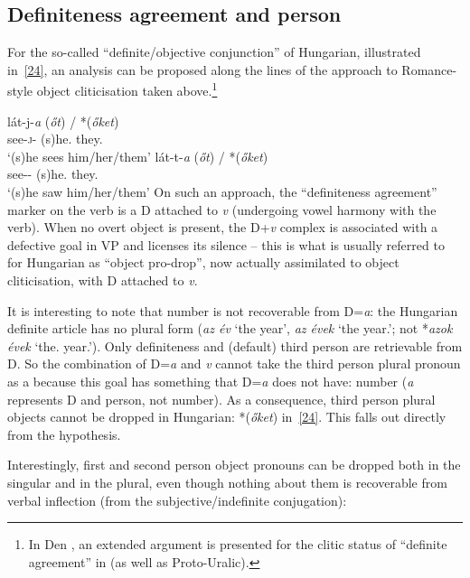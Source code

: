 \documentclass[output=paper]{langsci/langscibook}
\begin{document}
\begin{refcontext}
\section{Definiteness agreement and person}
\label{sec:16.5}

For the so-called \enquote{definite/objective conjunction} of Hungarian, illustrated
in~\eqref{24}, an analysis can be proposed along the lines of the approach to
Romance-style object cliticisation taken above.\footnote{In Den
    \citet{dikkenkeneseifs}, an extended argument is presented for the clitic
    status of \enquote{definite agreement} in  (as well as Proto-Uralic).}

\ea \label{24}
    \ea \gll l\'at-j-\emph{a} (\emph{\H{o}t}) / *(\emph{\H{o}ket})\\
    see-\textsc{j}-\Def{} (s)he.\Acc{} {} \phantom{*(}they.\Acc{}\\
    \glt \enquote*{(s)he sees him/her/them}
     \ex \gll   l\'at-t-\emph{a} (\emph{\H{o}t}) / *(\emph{\H{o}ket})\\
    see-\Pst-\Def{} (s)he.\Acc{} {} \phantom{*(}they.\Acc{}\\
    \glt \enquote*{(s)he saw him/her/them}
    \z
\z
On such an approach, the \enquote{definiteness agreement} marker on the verb is a D
attached to \emph{v} (undergoing vowel harmony with the verb). When no overt
object is present, the D+\emph{v} complex is associated with a defective goal
in VP and licenses its silence -- this is what is usually referred to for
Hungarian as \enquote{object pro-drop}, now actually assimilated to object
cliticisation, with D attached to \emph{v}.

It is interesting to note that number is not recoverable from D=\emph{a}: the
Hungarian definite article has no plural form (\emph{az \'ev} \enquote*{the year},
\emph{az \'evek} \enquote*{the year.\Pl{}}; not *\emph{azok \'evek}
\enquote*{the.\Pl{} year.\Pl{}}).  Only definiteness and (default) third
person are retrievable from D. So the combination of D=\emph{a} and \emph{v}
cannot take the third person plural pronoun as a  because this
goal has something that D=\emph{a} does not have: number (\emph{a} represents D
and person, not number). As a consequence, third person plural objects cannot
be dropped in Hungarian: *(\emph{\H{o}ket}) in~\eqref{24}. This falls out
directly from the  hypothesis.

Interestingly, first and second person object pronouns can be dropped both in
the singular and in the plural, even though nothing about them is recoverable
from verbal inflection (from the subjective/indefinite conjugation):


\end{refcontext}
\end{document}

